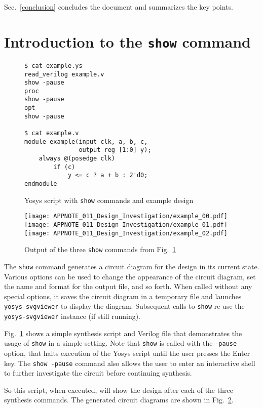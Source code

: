 \documentclass[9pt,technote,a4paper]{IEEEtran}
\begin{document}
Sec.~\ref{conclusion} concludes the document and summarizes the key points.

\section{Introduction to the {\tt show} command}
\label{intro_show}

\begin{figure}[b]
\begin{lstlisting}
$ cat example.ys
read_verilog example.v
show -pause
proc
show -pause
opt
show -pause

$ cat example.v
module example(input clk, a, b, c,
               output reg [1:0] y);
    always @(posedge clk)
        if (c)
            y <= c ? a + b : 2'd0;
endmodule
\end{lstlisting}
\caption{Yosys script with {\tt show} commands and example design}
\label{example_src}
\end{figure}

\begin{figure}[b!]
\texttt{[image: APPNOTE\_011\_Design\_Investigation/example\_00.pdf]}
\texttt{[image: APPNOTE\_011\_Design\_Investigation/example\_01.pdf]}
\texttt{[image: APPNOTE\_011\_Design\_Investigation/example\_02.pdf]}
\caption{Output of the three {\tt show} commands from Fig.~\ref{example_src}}
\label{example_out}
\end{figure}

The {\tt show} command generates a circuit diagram for the design in its
current state. Various options can be used to change the appearance of the
circuit diagram, set the name and format for the output file, and so forth.
When called without any special options, it saves the circuit diagram in
a temporary file and launches {\tt yosys-svgviewer} to display the diagram.
Subsequent calls to {\tt show} re-use the {\tt yosys-svgviewer} instance
(if still running).

Fig.~\ref{example_src} shows a simple synthesis script and Verilog file that
demonstrates the usage of {\tt show} in a simple setting. Note that {\tt show}
is called with the {\tt -pause} option, that halts execution of the Yosys
script until the user presses the Enter key. The {\tt show -pause} command
also allows the user to enter an interactive shell to further investigate the
circuit before continuing synthesis.

So this script, when executed, will show the design after each of the three
synthesis commands. The generated circuit diagrams are shown in Fig.~\ref{example_out}.
\end{document}
